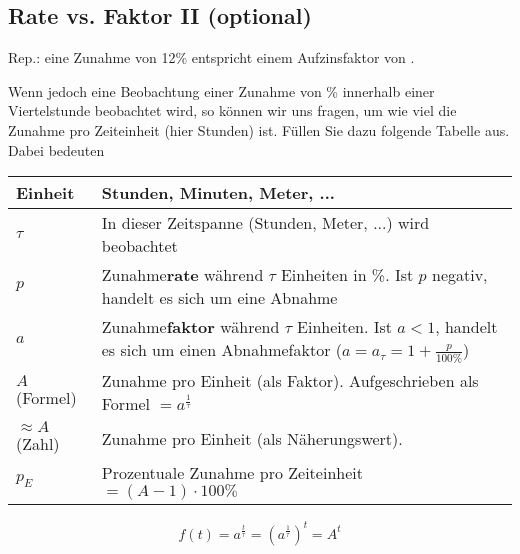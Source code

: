 \subsection{Rate vs. Faktor II (optional)}

Rep.: eine Zunahme von 12\% entspricht einem Aufzinsfaktor von .

Wenn jedoch eine Beobachtung einer Zunahme von \% innerhalb einer Viertelstunde beobachtet wird, so können wir uns fragen, um wie viel die Zunahme pro Zeiteinheit (hier Stunden) ist.
\newpage
Füllen Sie dazu folgende Tabelle aus. Dabei bedeuten

\begin{tabular}{lp{14cm}}\hline
  Einheit & Stunden, Minuten, Meter, ... \\\hline
  $\tau$  & In dieser Zeitspanne (Stunden, Meter, ...) wird beobachtet \\\hline
  $p$     & Zunahme\textbf{rate}\index{Zunahmerate}\index{Rate} während $\tau$ Einheiten in \%. Ist $p$ negativ, handelt es sich um eine Abnahme\\\hline
  $a$ & Zunahme\textbf{faktor}\index{Zunahmefaktor} während
  $\tau$ Einheiten. Ist $a<1$, handelt es sich um einen Abnahmefaktor
  ($a = a_{\tau} = 1+\frac{p}{100\%}$)\\\hline
  $A$ (Formel)   & Zunahme pro Einheit (als Faktor). Aufgeschrieben
  als Formel $=a^{\frac1{\tau}}$\\\hline
  $\approx A$ (Zahl)  & Zunahme pro Einheit (als Näherungswert).\\\hline
  $p_E$   & Prozentuale Zunahme pro Zeiteinheit $=(A-1)\cdot{}100\%$\\\hline
  \end{tabular} 

\leserluft{}
\leserluft{}
\newcommand{\ph}[1]{\noTRAINER{...........}\TRAINER{#1}}

$$f(t) = a^{\frac{t}\tau} = \left(a^{\frac1\tau}\right)^t= A^t$$

